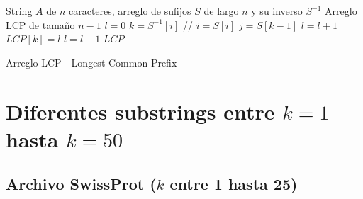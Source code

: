 \newpage

\begin{algorithm}
\begin{algorithmic}[1]
\REQUIRE String $A$ de $n$ caracteres, arreglo de sufijos $S$ de largo $n$ y su inverso $S^{-1}$ 
\ENSURE Arreglo LCP de tamaño $n-1$
\STATE $l = 0$
	\STATE $k = S^{-1}[i]$ // $i = S[i]$
	\STATE $j = S[k-1]$
    	\STATE $l = l+1$
	\ENDWHILE
	\STATE $LCP[k] = l$
		\STATE $l = l - 1$
	\ENDIF
\ENDFOR
\RETURN $LCP$
\end{algorithmic}
\caption{Arreglo LCP - Longest Common Prefix} \label{alg:algoritmo4}
\end{algorithm}

\newpage

\section*{Diferentes substrings entre $k = 1$ hasta $k = 50$}

\subsection*{Archivo SwissProt ($k$ entre 1 hasta 25)}

